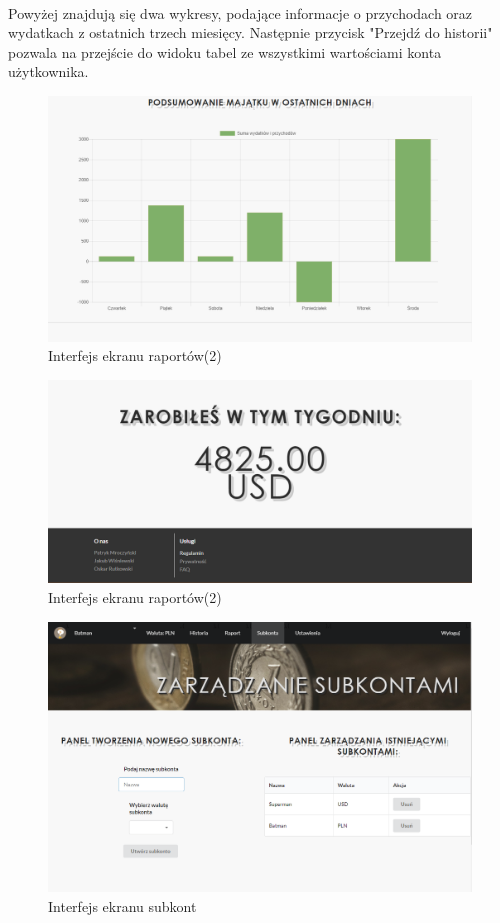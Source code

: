 \documentclass{article}
\begin{document}
\paragraph*{} Powyżej znajdują się dwa wykresy, podające informacje o przychodach oraz wydatkach z ostatnich trzech miesięcy. Następnie przycisk "Przejdź do historii" pozwala na przejście do widoku tabel ze wszystkimi wartościami konta użytkownika.
\begin{figure}[H]
	\hspace*{-2cm}
	\includegraphics[scale=0.5]{assets/rap3.png}
	\caption[]{Interfejs ekranu raportów(2)}
	\label{fig:rap3}
\end{figure}
\begin{figure}[H]
	\hspace*{-2cm}
	\includegraphics[scale=0.5]{assets/rap4.png}
	\caption[]{Interfejs ekranu raportów(2)}
	\label{fig:rap4}
\end{figure}
\begin{figure}[H]
	\hspace*{-2cm}
	\includegraphics[scale=0.5]{assets/sub.png}
	\caption[]{Interfejs ekranu subkont}
	\label{fig:subkonta}
\end{figure}
\end{document}
